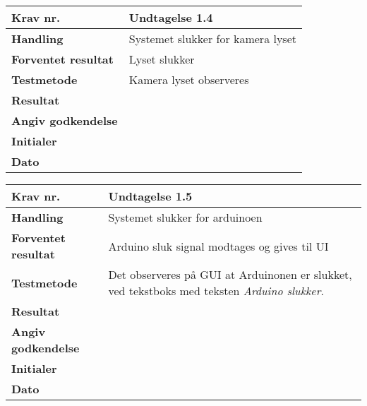 	\begin{center}
		\begin{longtable}{ | m{4cm}| m{8.5cm}|} 
			\hline
			\textbf{Krav nr.} & Undtagelse 1.4  \\ 
			\hline
			\textbf{Handling} & Systemet slukker for kamera lyset   \\
			\hline
			\textbf{Forventet resultat} & Lyset slukker \\
			\hline
			\textbf{Testmetode}  & Kamera lyset observeres  \\
			\hline
			\textbf{Resultat}  &    \\
			\hline
			\textbf{Angiv godkendelse} &     \\
			\hline
			\textbf{Initialer} &     \\
			\hline
			\textbf{Dato} &    \\
			\hline
		\end{longtable}
	\end{center}		
			
	\begin{center}
		\begin{longtable}{ | m{4cm}| m{8.5cm}|} 
			\hline
			\textbf{Krav nr.} & Undtagelse 1.5  \\ 
			\hline
			\textbf{Handling} & Systemet slukker for arduinoen   \\
			\hline
			\textbf{Forventet resultat} & Arduino sluk signal modtages og gives til UI \\
			\hline
			\textbf{Testmetode}  & Det observeres på GUI at Arduinonen er slukket, ved tekstboks med teksten \textit{Arduino slukker}.  \\
			\hline
			\textbf{Resultat}  &    \\
			\hline
			\textbf{Angiv godkendelse} &     \\
			\hline
			\textbf{Initialer} &     \\
			\hline
			\textbf{Dato} &    \\
			\hline
		\end{longtable}
	\end{center}
